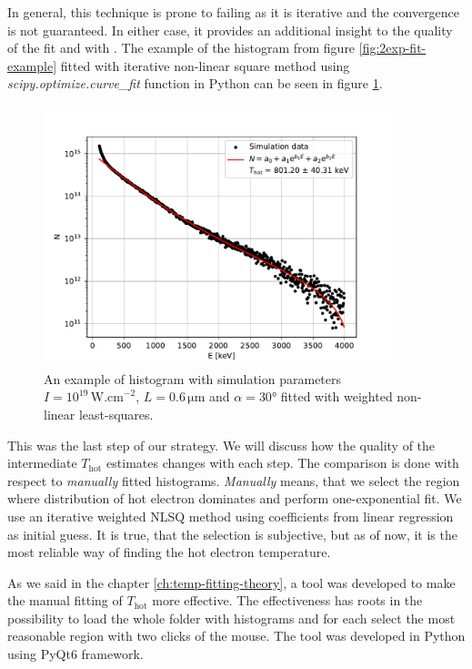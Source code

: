 In general, this technique is prone to failing as it is iterative and the convergence is not guaranteed. In either case, it provides an additional insight to the quality of the fit and with . The example of the histogram from figure \ref{fig:2exp-fit-example} fitted with iterative non-linear square method using \textit{scipy.optimize.curve\_fit} function in Python can be seen in figure \ref{fig:nlsq-fit-example}.
\begin{figure}[t]
	\centering
	\includegraphics[width=0.9\textwidth]{figures/hist_1e19_060_30_nlsq}
	\caption{An example of histogram with simulation parameters $I=10^{19}\,\mathrm{W.cm}^{-2}$, $L=0.6\,\mathrm{\mu m}$ and $\alpha = 30$° fitted with weighted non-linear least-squares.}
	\label{fig:nlsq-fit-example}
\end{figure}

This was the last step of our strategy. We will discuss how the quality of the intermediate $T_{\mathrm{hot}}$ estimates changes with each step. The comparison is done with respect to \textit{manually} fitted histograms. \textit{Manually} means, that we select the region where distribution of hot electron dominates and perform one-exponential fit. We use an iterative weighted NLSQ method using coefficients from linear regression as initial guess. It is true, that the selection is subjective, but as of now, it is the most reliable way of finding the hot electron temperature.

As we said in the chapter \ref{ch:temp-fitting-theory}, a tool was developed to make the manual fitting of $T_{\mathrm{hot}}$ more effective. The effectiveness has roots in the possibility to load the whole folder with histograms and for each select the most reasonable region with two clicks of the mouse. The tool was developed in Python using PyQt6 framework.

